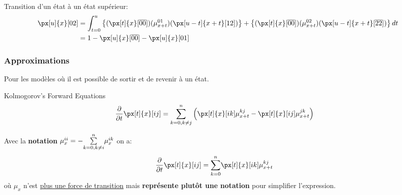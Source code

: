\documentclass[10pt, french]{article}
\begin{document}
\begin{multicols*}{2}
Transition d'un état à un état supérieur:
\begin{align*}
	\px[u]{x}[02] 
	&=	\int_{t = 0}^{u} \left\{(\px[t]{x}[\overline{00}]) (\mu_{x + t}^{01}) (\px[u - t]{x + t}[12])\right\} + \left\{(\px[t]{x}[\overline{00}]) (\mu_{x + t}^{02}) (\px[u - t]{x + t}[\overline{22}])\right\} dt	\\
	&=	1 - \px[u]{x}[\overline{00}] - \px[u]{x}[01]
\end{align*}

\subsubsection*{Approximations}
Pour les modèles où il est possible de sortir et de revenir à un état.

\begin{conceptgen}{Kolmogorov's Forward Equations}
\begin{align*}
	\derivee{t}{} \px[t]{x}[ij]
	&=	\sumz{n}{k = 0, k \neq j} \left( \px[t]{x}[ik] \mu_{x + t}^{kj} - \px[t]{x}[ij] \mu_{x + t}^{jk}  \right)
\end{align*}

Avec la \textbf{notation} $\mu_{x}^{ii} = - \overset{n}{\underset{k = 0, k \neq i}{\sum}} \mu_{x}^{ik}$ on a:
\begin{align*}
	\derivee{t}{} \px[t]{x}[ij]
	&=	\sumz{n}{k = 0} \px[t]{x}[ik] \mu_{x + t}^{kj}
\end{align*}
où $\mu_{x}$ n'est \underline{plus une force de transition} mais \textbf{représente plutôt une notation} pour simplifier l'expression.
\end{conceptgen}


\end{multicols*}
\end{document}

